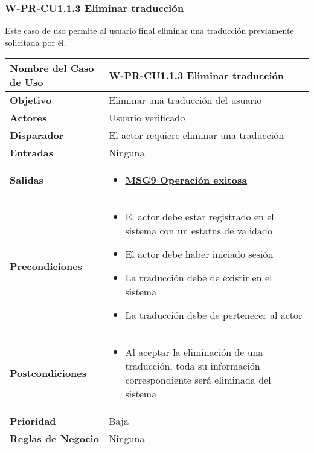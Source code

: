 \subsubsection{W-PR-CU1.1.3 Eliminar traducción}
Este caso de uso permite al usuario final eliminar una traducción previamente solicitada por él.

\begin{longtable}{|J{5cm}|J{10.3cm}|}
	\hline
	\textbf{Nombre del Caso de Uso} &
		W-PR-CU1.1.3 Eliminar traducción \\ \hline
	\textbf{Objetivo} &
		Eliminar una traducción del usuario \\ \hline
	\textbf{Actores} &
		Usuario verificado \\ \hline 
	\textbf{Disparador} & 
		El actor requiere eliminar una traducción \\ \hline 
	\textbf{Entradas} & 
		Ninguna \\ \hline 
	\textbf{Salidas} & 
		\begin{itemize}
			\item \hyperref[MSG9]{\bf MSG9 Operación exitosa}
		\end{itemize} \\ \hline
	\textbf{Precondiciones} &
		\begin{itemize}
		    \item El actor debe estar registrado en el sistema con un estatus de validado
		    \item El actor debe haber iniciado sesión
		    \item La traducción debe de existir en el sistema
		    \item La traducción debe de pertenecer al actor
		\end{itemize} \\ \hline
	\textbf{Postcondiciones} &
		\begin{itemize}
		    \item Al aceptar la eliminación de una traducción, toda su información correspondiente será eliminada del sistema
		\end{itemize} \\ \hline
	\textbf{Prioridad} & 
		Baja \\ \hline
	\textbf{Reglas de Negocio} & 
		Ninguna \\ \hline

\end{longtable}

